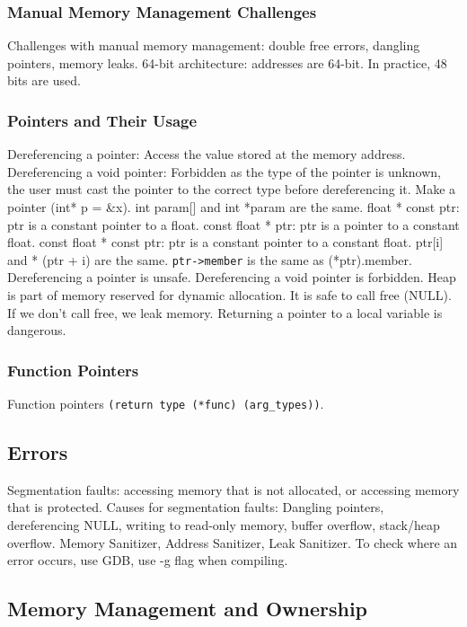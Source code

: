 \documentclass{article}
\begin{document}
\subsubsection*{Manual Memory Management Challenges}
Challenges with manual memory management: double free errors, dangling pointers, memory leaks.
64-bit architecture: addresses are 64-bit. In practice, 48 bits are used.

\subsubsection*{Pointers and Their Usage}
Dereferencing a pointer: Access the value stored at the memory address.
Dereferencing a void pointer: Forbidden as the type of the pointer is unknown, the user must cast the pointer
to the correct type before dereferencing it.
Make a pointer (int* p = \&x).
int param[] and int *param are the same.
float * const ptr: ptr is a constant pointer to a float.
const float * ptr: ptr is a pointer to a constant float.
const float * const ptr: ptr is a constant pointer to a constant float.
ptr[i] and * (ptr + i) are the same.
\texttt{ptr->member} is the same as (*ptr).member.
Dereferencing a pointer is unsafe. 
Dereferencing a void pointer is forbidden.
Heap is part of memory reserved for dynamic allocation.
It is safe to call free (NULL).
If we don't call free, we leak memory.
Returning a pointer to a local variable is dangerous.

\subsubsection*{Function Pointers}
Function pointers \texttt{(return type (*func) (arg\_types))}.

\subsection*{Errors}

Segmentation faults: accessing memory that is not allocated, or accessing memory that is protected.
Causes for segmentation faults: Dangling pointers, dereferencing NULL, writing to read-only memory,
buffer overflow, stack/heap overflow.
Memory Sanitizer, Address Sanitizer, Leak Sanitizer.
To check where an error occurs, use GDB, use -g flag when compiling.

\subsection*{Memory Management and Ownership}
\end{document}
